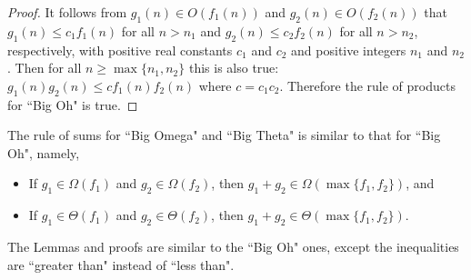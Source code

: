 {}  %
\begin{proof}
It follows from $g_1(n) \in O(f_1(n))$ and $g_2(n) \in O(f_2(n))$ that 
$g_1(n) \leq c_1f_1(n)$ for all $n > n_1$ and
$g_2(n) \leq c_2f_2(n)$ for all $n > n_2$, respectively, with 
positive real constants $c_1$ and $c_2$ and positive integers
$n_1$ and $n_2$. Then for all $n \geq \max\{n_1,n_2\}$ 
this is also true: $g_1(n)g_2(n) \leq %
cf_1(n)f_2(n)$ where $c=c_1c_2$. 
Therefore the rule of products for ``Big Oh" is true.
\end{proof}

{}%
The rule of sums for ``Big Omega" and ``Big Theta" is similar to that
for ``Big Oh", namely,
\begin{itemize}
\item[] \hspace*{-10mm} If $g_1\in\Omega(f_1)$ and $g_2\in\Omega(f_2)$, then 
$g_1 + g_2\in\Omega(\max\{f_1,f_2\})$, and
\item[] \hspace*{-10mm} If $g_1\in\Theta(f_1)$ and $g_2\in\Theta(f_2)$, then 
$g_1 + g_2\in\Theta(\max\{f_1,f_2\})$. 
\end{itemize} 

The Lemmas and proofs are similar to the ``Big Oh" ones, 
except the inequalities are ``greater than" instead of ``less than".

